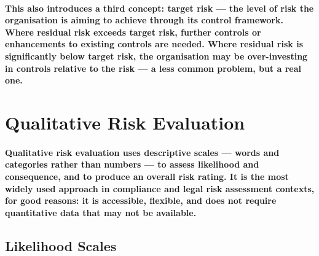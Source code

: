 \paragraph{This also introduces a third concept: \textbf{target risk} — the level of risk the organisation is aiming to achieve through its control framework. Where residual risk exceeds target risk, further controls or enhancements to existing controls are needed. Where residual risk is significantly below target risk, the organisation may be over-investing in controls relative to the risk — a less common problem, but a real one.}

\section{Qualitative Risk Evaluation}
\paragraph{\textbf{Qualitative risk evaluation} uses descriptive scales — words and categories rather than numbers — to assess likelihood and consequence, and to produce an overall risk rating. It is the most widely used approach in compliance and legal risk assessment contexts, for good reasons: it is accessible, flexible, and does not require quantitative data that may not be available.}

\subsection{Likelihood Scales}
